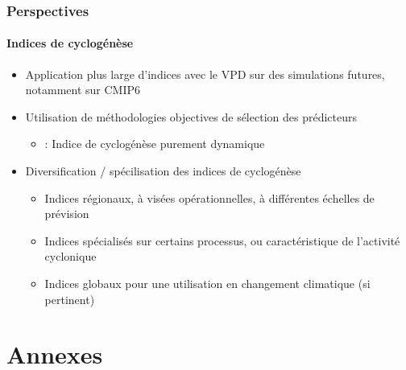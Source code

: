 \documentclass[aspectratio=169, usepdftitle=false, xcolor={dvipsnames}, 9pt,table]{beamer}
\begin{document}
\begin{frame}[c]
    \frametitle{Perspectives}
    \framesubtitle{Indices de cyclogénèse}
    \begin{block}
        \small
        \begin{itemize}
            \setlength{\itemsep}{2ex}
            \item<1-> Application plus large d'indices avec le VPD sur des simulations futures, notamment sur CMIP6
            \item<2-> Utilisation de méthodologies objectives de sélection des prédicteurs
                \begin{itemize}
                    \item \cite{wang_dynamic_2020,murakami_patterns_2022} : Indice de cyclogénèse purement dynamique
                \end{itemize}
            \item<3-> Diversification / spécilisation des indices de cyclogénèse
                \begin{itemize}
                    \item Indices régionaux, à visées opérationnelles, à différentes échelles de prévision
                    \item Indices spécialisés sur certains processus, ou caractéristique de l'activité cyclonique
                    \item Indices globaux pour une utilisation en changement climatique (si pertinent)
                \end{itemize}
        \end{itemize}
    \end{block}
\end{frame}

\makethankyouslide

%

\appendix
\section*{Annexes}
\end{document}

